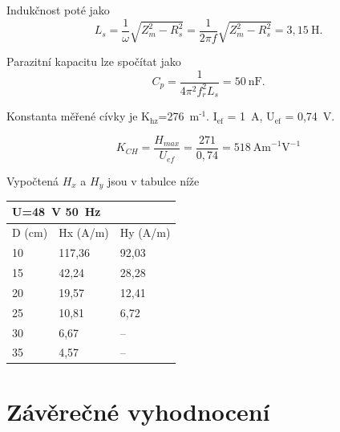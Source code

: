 \documentclass[a4paper,12pt]{article}   %
\newcommand{\tsub}[1]{$_\textrm{#1}$}
\newcommand{\texp}[1]{$^\textrm{#1}$}
\begin{document}
Indukčnost poté jako 
\begin{equation}
  L_s = \frac{1}{\omega}\sqrt{Z_m^2 - R_s^2} = \frac{1}{2\pi f}\sqrt{Z_m^2 - R_s^2} = 3,15~\text{H}.
\end{equation}

Parazitní kapacitu lze spočítat jako
\begin{equation}
  C_p = \frac{1}{4\pi^2f_r^2L_s} = 50~\text{nF}.
\end{equation}

Konstanta měřené cívky je K\tsub{hz}=276~m\texp{-1}. I\tsub{ef} = 1~A, U\tsub{ef} = 0,74~V.

\begin{equation}
  K_{CH} = \frac{H_{max}}{U_{ef}} =  \frac{271}{0,74} = 518~\text{Am}^{-1}\text{V}^{-1}
\end{equation}

Vypočtená $H_x$ a $H_y$ jsou v tabulce níže

\begin{table}[h!]
  \centering
  \begin{tabular}{|l|l|l|}
  \hline
  \multicolumn{2}{|l|}{U=48~V 50~Hz} &         \\ \hline
  D (cm)               & Hx (A/m)               & Hy (A/m) \\ \hline
  10                   & 117,36                & 92,03   \\ \hline
  15                   & 42,24                 & 28,28   \\ \hline
  20                   & 19,57                 & 12,41   \\ \hline
  25                   & 10,81                 & 6,72    \\ \hline
  30                   & 6,67                  & --    \\ \hline
  35                   & 4,57                  & --    \\ \hline
  \end{tabular}
  \end{table}

\section{Závěrečné vyhodnocení}
\label{chap:zaver}
\end{document}
